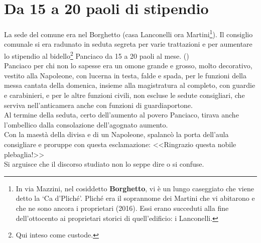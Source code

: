 
\chapter{Da 15 a 20 paoli di stipendio}
La sede del comune era nel Borghetto (casa Lanconelli ora Martini\footnote{In via Mazzini, nel cosiddetto \textbf{Borghetto}, vi è un lungo caseggiato che viene detto  la ‘Ca d'Pliché'. Pliché era il soprannome dei Martini che vi abitarono e che ne sono ancora i proprietari (2016). Essi erano succeduti alla fine dell'ottocento ai proprietari storici di quell'edificio: i Lanconelli.}). Il consiglio comunale si era radunato in seduta segreta per varie trattazioni e per aumentare lo stipendio al bidello\footnote{Qui inteso come custode.} Panciaco da 15 a 20 paoli al mese. (\Large {}\normalfont \normalsize \:)\\
\indent Panciaco per chi non lo sapesse era un omone grande e grosso, molto decorativo, vestito alla Napoleone, con lucerna in testa, falde e spada, per le funzioni della messa cantata della domenica, insieme alla magistratura al completo, con guardie e carabinieri, e per le altre funzioni civili, non escluse le sedute consigliari, che serviva nell'anticamera anche con funzioni di guardiaportone.\\
\indent Al termine della seduta, certo dell'aumento al povero Panciaco, tirava anche l'ombellico dalla consolazione dell'agognato aumento.\\
\indent Con la maestà della divisa e di un Napoleone, spalancò la porta dell'aula consigliare e proruppe con questa esclamazione: <<Ringrazio questa nobile plebaglia!>>\\
\indent Si arguisce che il discorso studiato non lo seppe dire o si confuse.

